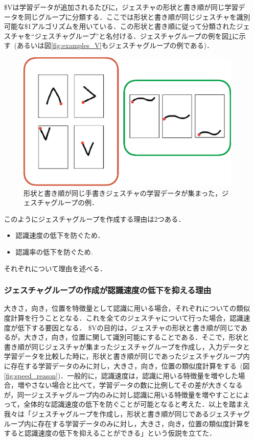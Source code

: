\$Vは学習データが追加されるたびに，ジェスチャの形状と書き順が同じ学習データを同じグループに分類する．ここでは形状と書き順が同じジェスチャを識別可能な\$1アルゴリズムを用いている．この形状と書き順に従って分類されたジェスチャを``ジェスチャグループ''と名付ける．ジェスチャグループの例を図\ref{fig:gesture_group}に示す~(あるいは図\ref{fig:examples_V}もジェスチャグループの例である)．

\begin{figure} [h!]
	\begin{center}
		\includegraphics [width=0.7\hsize ]{img/gesture_group.eps}
	\end{center}
	\caption{形状と書き順が同じ手書きジェスチャの学習データが集まった，ジェスチャグループの例．}
	\label{fig:gesture_group}
\end{figure}

このようにジェスチャグループを作成する理由は2つある．
\begin{itemize}
\item 認識速度の低下を防ぐため．
\item 認識率の低下を防ぐため.
\end{itemize}
それぞれについて理由を述べる．


\subsubsection{ジェスチャグループの作成が認識速度の低下を抑える理由}

大きさ，向き，位置を特徴量として認識に用いる場合，それぞれについての類似度計算を行うこととなる．これを全てのジェスチャについて行った場合，認識速度が低下する要因となる．
\$Vの目的は，ジェスチャの形状と書き順が同じであるが，大きさ，向き，位置に関して識別可能にすることである．そこで，形状と書き順が同じジェスチャが集まったジェスチャグループを作成し，入力データと学習データを比較した時に，形状と書き順が同じであったジェスチャグループ内に存在する学習データのみに対し，大きさ，向き，位置の類似度計算をする~(図\ref{fig:speed_reason})．一般的に，認識速度は，認識に用いる特徴量を増やした場合，増やさない場合と比べて，学習データの数に比例してその差が大きくなるが，同一ジェスチャグループ内のみに対し認識に用いる特徴量を増やすことによって，全体的な認識速度の低下を防ぐことが可能となると考えた．以上を踏まえ我々は「ジェスチャグループを作成し，形状と書き順が同じであるジェスチャグループ内に存在する学習データのみに対し，大きさ，向き，位置の類似度計算をすると認識速度の低下を抑えることができる」という仮説を立てた．

